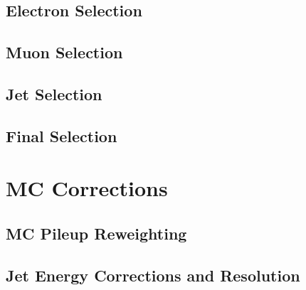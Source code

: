 \subsection{Electron Selection}
\subsection{Muon Selection}
\subsection{Jet Selection}
\subsection{Final Selection}

\section{MC Corrections}
\subsection{MC Pileup Reweighting}
\subsection{Jet Energy Corrections and Resolution}
